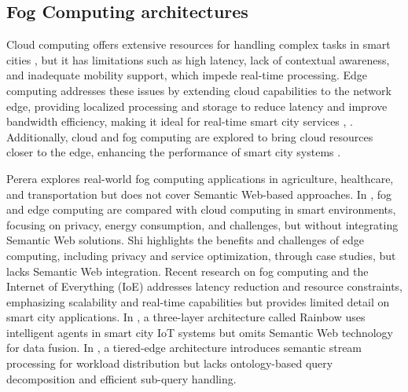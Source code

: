 \documentclass[5p,times]{elsarticle}
\begin{document}
\subsection{Fog Computing architectures}


Cloud computing offers extensive resources for handling complex tasks in smart cities \cite{Garca2011ExploringTL},
 but it has limitations such as high latency, lack of contextual awareness, and inadequate mobility support,
  which impede real-time processing. Edge computing addresses these issues by extending cloud capabilities to 
  the network edge, providing localized processing and storage to reduce latency and improve bandwidth efficiency,
   making it ideal for real-time smart city services \cite{Ahmed2017BringingCC}, \cite{Rahman2019BlockchainAI}.
    Additionally, cloud and fog computing are explored to bring cloud resources closer to the edge,
     enhancing the performance of smart city systems \cite{Abbas2018MobileEC}.




Perera \cite{Perera2017FogCF} explores real-world fog computing applications in agriculture, healthcare, and transportation
 but does not cover Semantic Web-based approaches. In \cite{Hu2017SurveyOF}, fog and edge computing are compared with cloud computing
  in smart environments, focusing on privacy, energy consumption, and challenges, but without integrating Semantic
   Web solutions. Shi \cite{Shi2016EdgeCV} highlights the benefits and challenges of edge computing, including privacy 
   and service optimization, through case studies, but lacks Semantic Web integration. Recent research on fog 
   computing and the Internet of Everything (IoE) \cite{Baccarelli2017FogOE} addresses latency reduction and 
   resource constraints, emphasizing scalability and real-time capabilities but provides limited detail on
    smart city applications. In \cite{Giordano2016SmartAA}, a three-layer architecture called Rainbow
     uses intelligent agents in smart city IoT systems but omits Semantic Web technology for data fusion.
      In \cite{inproceedings61}, a tiered-edge architecture introduces semantic stream processing 
      for workload distribution but lacks ontology-based query decomposition and efficient sub-query handling.
\end{document}
